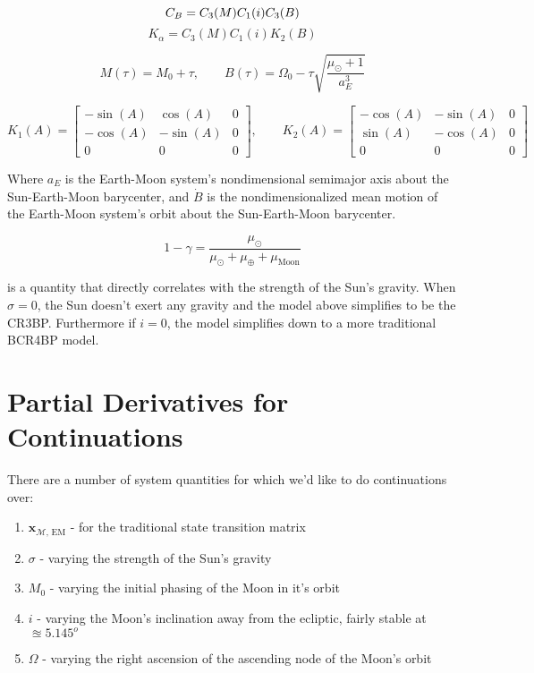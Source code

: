 \documentclass[]{article}
\begin{document}
	\begin{equation}
		C_B = C_3(M) C_1(i) C_3(B) \\
	\end{equation}
	\begin{equation}
		K_\alpha = C_3(M) C_1(i) K_2(B)
	\end{equation}
	
	\begin{equation}
		M(\tau) = M_0 + \tau, \quad\quad B(\tau) = \Omega_0 - \tau\sqrt{\frac{\mu_\odot + 1}{a_E^3}}
	\end{equation}
	
	\begin{equation*}
		K_1(A) = \begin{bmatrix}
			-\sin{(A)} & \cos{(A)} & 0 \\
			-\cos{(A)} & -\sin{(A)} & 0 \\
			0 & 0 & 0
		\end{bmatrix}, \quad\quad K_2(A) = \begin{bmatrix}
			-\cos{(A)} & -\sin{(A)} & 0 \\
			\sin{(A)} & -\cos{(A)} & 0 \\
			0 & 0 & 0
		\end{bmatrix}
	\end{equation*}
	
	Where $a_E$ is the Earth-Moon system's nondimensional semimajor axis about the Sun-Earth-Moon barycenter, and $\dot{B}$ is the nondimensionalized mean motion of the Earth-Moon system's orbit about the Sun-Earth-Moon barycenter.
	
	\begin{equation}
		1 - \gamma = \frac{\mu_\odot}{\mu_\odot + \mu_\oplus + \mu_\text{Moon}}
	\end{equation}
	
	is a quantity that directly correlates with the strength of the Sun's gravity.  When $\sigma = 0$, the Sun doesn't exert any gravity and the model above simplifies to be the CR3BP.  Furthermore if $i = 0$, the model simplifies down to a more traditional BCR4BP model.
	
	\section{Partial Derivatives for Continuations}
	
	There are a number of system quantities for which we'd like to do continuations over:
	
	\begin{enumerate}
		\item $\mathbf{x}_{\mathcal{M}\text{, EM}}$ - for the traditional state transition matrix
		\item $\sigma$ - varying the strength of the Sun's gravity
		\item $M_0$ - varying the initial phasing of the Moon in it's orbit
		\item $i$ - varying the Moon's inclination away from the ecliptic, fairly stable at $\approxeq 5.145^o$
		\item $\Omega$ - varying the right ascension of the ascending node of the Moon's orbit
	\end{enumerate}
	
\end{document}
